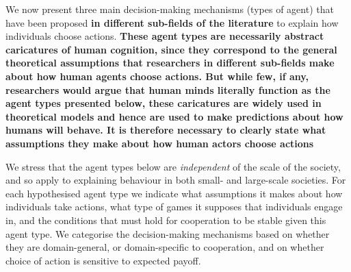 \documentclass[10pt, a4paper, fleqn]{article}
\begin{document}
We now present three main decision-making mechanisms (types of agent) that have been proposed \textbf{in different sub-fields of the literature} to explain how individuals choose actions. \textbf{These agent types are necessarily abstract caricatures of human cognition, since they correspond to the general theoretical assumptions that researchers in different sub-fields make about how human agents choose actions. But while few, if any, researchers would argue that human minds literally function as the agent types presented below, these caricatures are widely used in theoretical models and hence are used to make predictions about how humans will behave. It is therefore necessary to clearly state what assumptions they make about how human actors choose actions} 

We stress that the agent types below are \textit{independent} of the scale of the society, and so apply to explaining behaviour in both small- and large-scale societies. For each hypothesised agent type we indicate what assumptions it makes about how individuals take actions, what type of games it supposes that individuals engage in, and the conditions that must hold for cooperation to be stable given this agent type. We categorise the decision-making mechanisms based on whether they are domain-general, or domain-specific to cooperation, and on whether choice of action is sensitive to expected payoff. 
\end{document}
